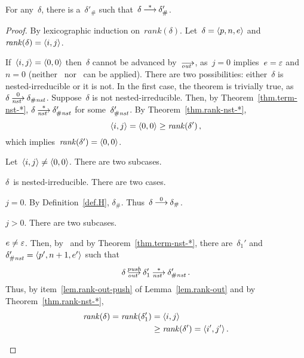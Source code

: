 
\begin{theorem}[Termination]\label{thm.term}\strut\\
  For any~$\delta$, there is a~$\delta'_\#$ such
  that~$\delta\trans[*]\delta'_\#$.
\end{theorem}
\begin{proof}
  By lexicographic induction on~$rank(\delta)$.  Let~$\delta=\<p,n,e>$ and
  $\rank(\delta)=\<i,j>$.
  \begin{basis}
    If~$\<i,j>=\<0,0>$ then~$\delta$ cannot be advanced by~$\out$, as~$j=0$
    implies~$e=\varepsilon$ and~$n=0$ (neither~ nor~ can be
    applied).  There are two possibilities:  either~$\delta$ is
    nested-irreducible or it is not.  In the first case, the theorem is
    trivially true, as~$\delta\nst[0]\delta_\Hnst$.  Suppose~$\delta$ is not
    nested-irreducible.  Then, by Theorem~\ref{thm.term-nst-*},
    $\delta\nst[*]\delta'_\Hnst$ for some~$\delta'_{\#\mathit{nst}}$.  By
    Theorem~\ref{thm.rank-nst-*},
    \[
      \<i,j>=\<0,0>\ge\rank(\delta')\,,
    \]
    which implies~$\rank(\delta')=\<0,0>$.
  \end{basis}
  \begin{induction}
    Let~$\<i,j>\ne\<0,0>$.
    There are two subcases.
    \begin{case}
      \label{thm.term.Hnst}
      $\delta$~is nested-irreducible.
      There are two cases.
      \begin{subcase}
        \label{thm.term.Hnst-j0}
        $j=0$.  By Definition~\ref{def.H}, $\delta_\#$.
        Thus~$\delta\trans[0]\delta_\#$.
      \end{subcase}
      \begin{subcase}
        \label{thm.term.Hnst-j>0}
        $j>0$.
        There are two subcases.
        \begin{subsubcase}
          \label{thm.term.Hnst-j>0-nonnil}
          $e\ne\varepsilon$.
          Then, by~ and by Theorem~\ref{thm.term-nst-*}, there
          are~$\delta_1'$ and~$\delta'_\Hnst=\<p',n+1,e'>$ such that
          \[
            \delta\outpush\delta_1'\nst[*]\delta'_\Hnst\,.
          \]
          Thus, by item~\eqref{lem.rank-out-push} of
          Lemma~\ref{lem.rank-out} and by Theorem~\ref{thm.rank-nst-*},
          \begin{align*}
            \rank(\delta)=\rank(\delta_1')&=\<i,j>\\
                                          &\ge\rank(\delta')=\<i',j'>\,.
          \end{align*}

\end{subsubcase}
\end{subcase}
\end{case}
\end{induction}
\end{proof}
